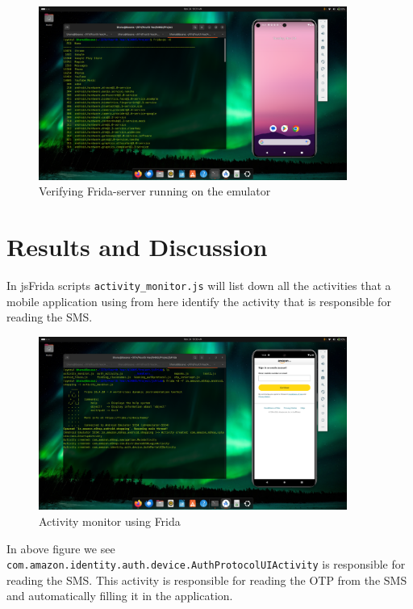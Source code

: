 \documentclass[a4paper,12pt]{article}
\begin{document}
\begin{figure}
    \centering
    \includegraphics[width=0.9\textwidth]{../images/verifying-frida-running.png}
    \caption{Verifying Frida-server running on the emulator}
\end{figure}


\section{Results and Discussion}
In jsFrida scripts \texttt{activity\_monitor.js} will list down all the activities that a mobile application using from here identify the activity that is responsible for reading the SMS.
\begin{figure}[h]
    \centering
    \includegraphics[width=0.9\textwidth]{../images/activity-monitor.png}
    \caption{Activity monitor using Frida}
\end{figure}

In above figure we see \texttt{com.amazon.identity.auth.device.AuthProtocolUIActivity} is responsible for reading the SMS. This activity is responsible for reading the OTP from the SMS and automatically filling it in the application.
\end{document}
